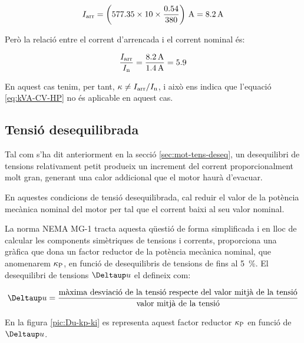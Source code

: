 \begin{exemple}[\MotorArrencNEMA{}]
    \[
      I\ped{arr} = \left(\num{577,35} \times 10 \times \frac{\num{0,54}}{380}\right) \,\unit{A} = \qty{8,2}{A}
    \]

    Però la relació entre el corrent d'arrencada i el corrent nominal és:
    
    \[
        \frac{I_\mathrm{arr}}{I_\mathrm{n}} = \frac{\qty{8,2}{A}}{\qty{1,4}{A}} = \num{5,9}
    \]

    En aquest cas tenim, per tant, $\kappa \neq I_\mathrm{arr}/I_\mathrm{n}$, i això ens indica que l'equació \eqref{eq:kVA-CV-HP} no és aplicable en aquest cas.
\end{exemple}

\subsection{Tensió desequilibrada}\label{sec:NEMA-U-deseq}

Tal com s'ha dit anteriorment en la secció \ref{sec:mot-tens-deseq}, un desequilibri de tensions relativament petit produeix un increment del corrent proporcionalment molt gran, generant una  calor addicional que el motor haurà d'evacuar.

En aquestes condicions de tensió desequilibrada, cal reduir el valor de la potència mecànica nominal del motor per tal que el corrent baixi al seu valor nominal.

La norma NEMA MG-1 tracta aquesta qüestió de forma simplificada i en lloc de calcular les components simètriques de tensions i corrents, proporciona una gràfica que dona un factor reductor de la potència mecànica nominal, que anomenarem $\kappa_\mathrm{P}$, en funció de desequilibris de tensions de fins al \qty{5}{\%}. El desequilibri de tensions $\Deltaup u$ el defineix com:

\begin{equation}
    \Deltaup u = \frac{\text{màxima desviació de la tensió respecte del valor mitjà de la tensió}}{\text{valor mitjà de la tensió}}
\end{equation}

En la figura \vref{pic:Du-kp-ki} es representa aquest factor reductor $\kappa_\mathrm{P}$ en funció de $\Deltaup u$.

\begin{center}
    
    \label{pic:Du-kp-ki}
\end{center}



